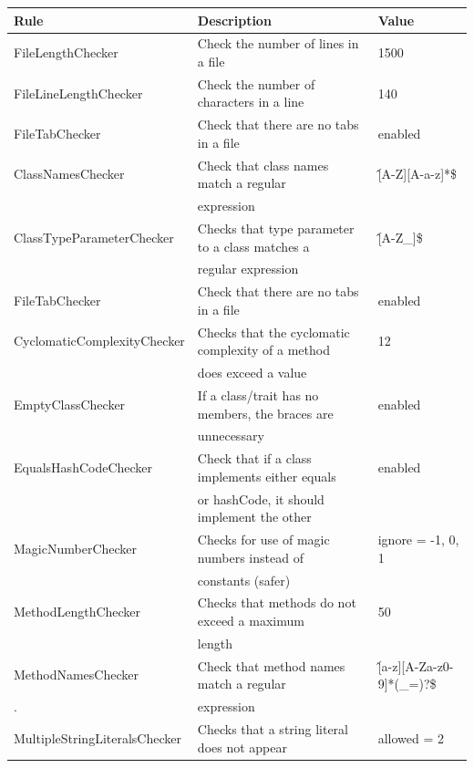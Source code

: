 \documentclass{report}
\begin{document}
\renewcommand{\arraystretch}{1.2}
\begin{center}
\begin{longtable}{|l|l|l|}
\hline
\textbf{Rule} & \textbf{Description} & \textbf{Value}  \\
\hline
FileLengthChecker & \small{Check the number of lines in a file} & 1500  \\
\hline
FileLineLengthChecker & \small{Check the number of characters in a line} & 140 \\
\hline
FileTabChecker & \small{Check that there are no tabs in a file} & enabled \\
\hline
ClassNamesChecker & \small{Check that class names match a regular}  & \^ [A-Z][A-a-z]*\$ \\
& \small{expression} & \\
\hline
\small{ClassTypeParameterChecker} & \small{Checks that type parameter to a class matches a} & \^[A-Z\_]\$ \\
& regular expression & \\
\hline
FileTabChecker & \small{Check that there are no tabs in a file} & enabled \\
\hline
\small{CyclomaticComplexityChecker} & \small{Checks that the cyclomatic complexity of a method} & 12 \\
&  \small{does exceed a value} & \\
\hline
EmptyClassChecker & \small{If a class/trait has no members, the braces are} & enabled \\
&  \small{unnecessary} & \\
\hline
\small{EqualsHashCodeChecker} & \small{Check that if a class implements either equals} & enabled \\ 
 & \small{or hashCode, it should implement the other} & \\
\hline
MagicNumberChecker & \small{Checks for use of magic numbers instead of} & ignore = -1, 0, 1 \\
& \small{constants (safer)} & \\
\hline
MethodLengthChecker & \small{Checks that methods do not exceed a maximum} & 50 \\
& \small{length} & \\
\hline
MethodNamesChecker & \small{Check that method names match a regular} & \^[a-z][A-Za-z0-9]*(\_=)?\$ \\
\tiny{.} & \small{expression} & \\
\hline
\small{MultipleStringLiteralsChecker} & \small{Checks that a string literal does not appear} & allowed = 2 \\

\end{longtable}
\end{center}
\end{document}
